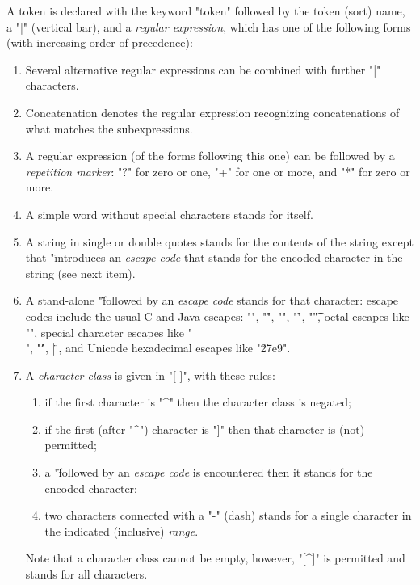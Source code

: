 \documentclass[11pt]{article} %
\begin{document}
\begin{manual}\label{man:token}
  A token is declared with the keyword "token" followed by the token (sort) name, a "|" (vertical
  bar), and a \emph{regular expression}, which has one of the following forms (with increasing order
  of precedence):
  \begin{enumerate}

  \item Several alternative regular expressions can be combined with further "|" characters.

  \item Concatenation denotes the regular expression recognizing concatenations of what matches the
    subexpressions.

  \item A regular expression (of the forms following this one) can be followed by a \emph{repetition
      marker}: "?" for zero or one, "+" for one or more, and "*" for zero or more.

  \item A simple word without special characters stands for itself.

  \item A string in single or double quotes stands for the contents of the string except that "\"
    introduces an \emph{escape code} that stands for the encoded character in the string (see next item).

  \item A stand-alone "\" followed by an \emph{escape code} stands for that character: escape codes
    include the usual C and Java escapes: "\n", "\r", "\a", "\f", "\t", octal escapes like "",
    special character escapes like "\\", "\'", \hacsc|\"|, and Unicode hexadecimal escapes like
    "\u27e9".

  \item A \emph{character class} is given in "[ ]", with these rules:
   \begin{enumerate}
    \item if the first character is "^" then the character class is negated;
    \item if the first (after "^") character is "]" then that character is (not) permitted;
    \item a "\" followed by an \emph{escape code} is encountered then it stands for the encoded
      character;
    \item two characters connected with a "-" (dash) stands for a single character in the indicated
      (inclusive) \emph{range}.
    \end{enumerate}
    Note that a character class cannot be empty, however, "[^]" is permitted and stands for all
    characters.


\end{enumerate}
\end{manual}
\end{document}
